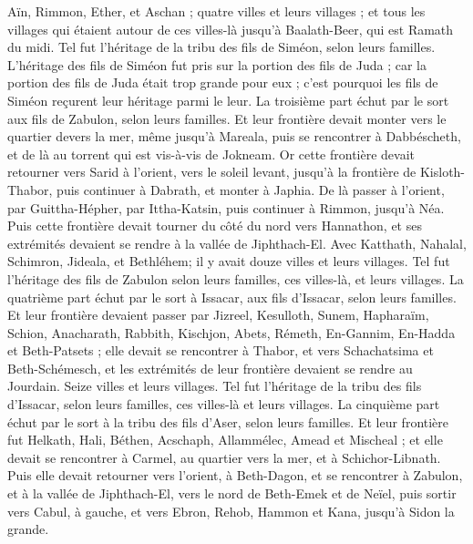 \begin{multicols}{2}
Aïn, Rimmon, Ether, et Aschan ; quatre villes et leurs villages ;
et tous les villages qui étaient autour de ces villes-là jusqu'à Baalath-Beer, qui est Ramath du midi. Tel fut l'héritage de la tribu des fils de Siméon, selon leurs familles.
L'héritage des fils de Siméon fut pris sur la portion des fils de Juda ; car la portion des fils de Juda était trop grande pour eux ; c'est pourquoi les fils de Siméon reçurent leur héritage parmi le leur.
La troisième part échut par le sort aux fils de Zabulon, selon leurs familles.
Et leur frontière devait monter vers le quartier devers la mer, même jusqu'à Mareala, puis se rencontrer à Dabbéscheth, et de là au torrent qui est vis-à-vis de Jokneam.
Or cette frontière devait retourner vers Sarid à l'orient, vers le soleil levant, jusqu'à la frontière de Kisloth-Thabor, puis continuer à Dabrath, et monter à Japhia.
De là passer à l'orient, par Guittha-Hépher, par Ittha-Katsin, puis continuer à Rimmon, jusqu'à Néa.
Puis cette frontière devait tourner du côté du nord vers Hannathon, et ses extrémités devaient se rendre à la vallée de Jiphthach-El.
Avec Katthath, Nahalal, Schimron, Jideala, et Bethléhem; il y avait douze villes et leurs villages.
Tel fut l'héritage des fils de Zabulon selon leurs familles, ces villes-là, et leurs villages.
La quatrième part échut par le sort à Issacar, aux fils d'Issacar, selon leurs familles.
Et leur frontière devaient passer par Jizreel, Kesulloth, Sunem,
Hapharaïm, Schion, Anacharath,
Rabbith, Kischjon, Abets,
Rémeth, En-Gannim, En-Hadda et Beth-Patsets ;
elle devait se rencontrer à Thabor, et vers Schachatsima et Beth-Schémesch, et les extrémités de leur frontière devaient se rendre au Jourdain. Seize villes et leurs villages.
Tel fut l'héritage de la tribu des fils d'Issacar, selon leurs familles, ces villes-là et leurs villages.
La cinquième part échut par le sort à la tribu des fils d'Aser, selon leurs familles.
Et leur frontière fut Helkath, Hali, Béthen, Acschaph,
Allammélec, Amead et Mischeal ; et elle devait se rencontrer à Carmel, au quartier vers la mer, et à Schichor-Libnath.
Puis elle devait retourner vers l'orient, à Beth-Dagon, et se rencontrer à Zabulon, et à la vallée de Jiphthach-El, vers le nord de Beth-Emek et de Neïel, puis sortir vers Cabul, à gauche,
et vers Ebron, Rehob, Hammon et Kana, jusqu'à Sidon la grande.

\end{multicols}

